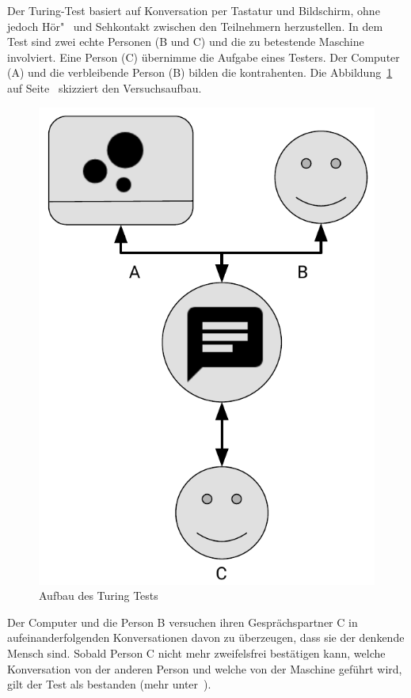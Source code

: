 Der Turing-Test basiert auf Konversation per Tastatur und Bildschirm, ohne jedoch Hör"~ und Sehkontakt zwischen den
Teilnehmern herzustellen. In dem Test sind zwei echte Personen (B und C) und die zu betestende Maschine involviert. Eine
Person (C) übernimme die Aufgabe eines Testers. Der Computer (A) und die verbleibende Person (B) bilden die kontrahenten.
Die Abbildung~\ref{fig:grundlagen_turingtest} auf Seite~\pageref{fig:grundlagen_turingtest} skizziert den Versuchsaufbau.

\begin{figure}[h]
    \centering
    \includegraphics[scale=0.6]{images/kapitel_2/turing_test.pdf}
    \caption{Aufbau des Turing Tests}
    \label{fig:grundlagen_turingtest}
\end{figure}

Der Computer und die Person B versuchen ihren Gesprächspartner C in aufeinanderfolgenden Konversationen davon zu
überzeugen, dass sie der denkende Mensch sind. Sobald Person C nicht mehr zweifelsfrei bestätigen kann, welche
Konversation von der anderen Person und welche von der Maschine geführt wird, gilt der Test als bestanden (mehr
unter~\cite{online_grundlagen_turing}).

